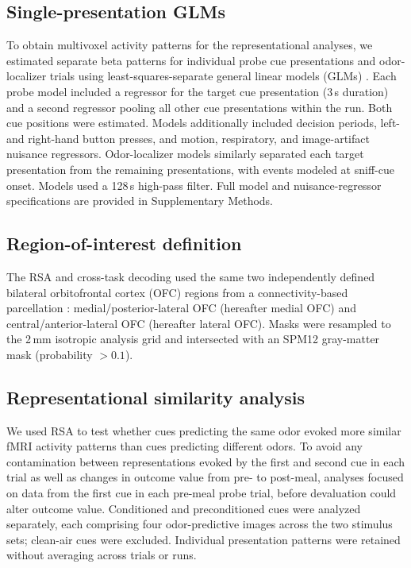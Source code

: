 \documentclass[12pt,letterpaper]{article}
\begin{document}
\subsection*{Single-presentation GLMs}

To obtain multivoxel activity patterns for the representational analyses, we estimated separate beta patterns for individual probe cue presentations and odor-localizer trials using least-squares-separate general linear models (GLMs) \citep{mumford2012deconvolving}. Each probe model included a regressor for the target cue presentation (3\,s duration) and a second regressor pooling all other cue presentations within the run. Both cue positions were estimated. Models additionally included decision periods, left- and right-hand button presses, and motion, respiratory, and image-artifact nuisance regressors. Odor-localizer models similarly separated each target presentation from the remaining presentations, with events modeled at sniff-cue onset. Models used a 128\,s high-pass filter. Full model and nuisance-regressor specifications are provided in Supplementary Methods.

\subsection*{Region-of-interest definition}

The RSA and cross-task decoding used the same two independently defined bilateral orbitofrontal cortex (OFC) regions from a connectivity-based parcellation \citep{kahnt2012connectivity}: medial/posterior-lateral OFC (hereafter medial OFC) and central/anterior-lateral OFC (hereafter lateral OFC). Masks were resampled to the 2\,mm isotropic analysis grid and intersected with an SPM12 gray-matter mask (probability $>0.1$).

\subsection*{Representational similarity analysis}
\label{rsa-probe}

We used RSA to test whether cues predicting the same odor evoked more similar fMRI activity patterns than cues predicting different odors. To avoid any contamination between representations evoked by the first and second cue in each trial as well as changes in outcome value from pre- to post-meal, analyses focused on data from the first cue in each pre-meal probe trial, before devaluation could alter outcome value. Conditioned and preconditioned cues were analyzed separately, each comprising four odor-predictive images across the two stimulus sets; clean-air cues were excluded. Individual presentation patterns were retained without averaging across trials or runs.
\end{document}
